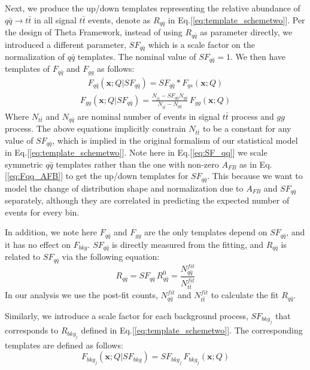 \documentclass{cmspaperpdf}
\begin{document}
Next, we produce the up/down templates representing the relative abundance of $q\bar{q}\rightarrow t\bar{t}$ in all signal $t\bar{t}$ events, denote as $R_{q\bar{q}}$ in Eq.[\ref{eq:template_schemetwo}]. Per the design of Theta Framework, instead of using $R_{q\bar{q}}$ as parameter directly,  we introduced a different parameter, $SF_{q\bar{q}}$ which is a scale factor on the normalization of $q\bar{q}$ templates. The nominal value of $SF_{q\bar{q}} = 1$. We then have templates of $F_{q\bar{q}}$ and $F_{gg}$ as follows:
\begin{align}
\label{eq:SF_qq}
F_{q\bar{q}}(\bm{x};Q|SF_{q\bar{q}})=SF_{q\bar{q}} * F_{qs}(\bm{x};Q) 
\end{align}
\begin{align}
F_{gg}(\bm{x};Q|SF_{q\bar{q}})=\frac{N_{t\bar{t}}-SF_{q\bar{q}}N_{q\bar{q}}}{N_{t\bar{t}}-N_{q\bar{q}}}\, F_{gg}(\bm{x};Q)
\end{align} 
Where $N_{t\bar{t}}$ and $N_{q\bar{q}}$ are nominal number of events in signal $t\bar{t}$ process and $gg$ process. The above equations implicitly constrain $N_{t\bar{t}}$ to be a constant for any value of $SF_{q\bar{q}}$, which is implied in the original formalism of our statistical model in Eq.[\ref{eq:template_schemetwo}]. Note here in Eq.[\ref{eq:SF_qq}] we scale symmetric $q\bar{q}$ templates rather than the one with non-zero $A_{FB}$ as in Eq.[\ref{eq:Fqq_AFB}] to get the up/down templates for $SF_{q\bar{q}}$. This because we want to model the change of distribution shape and normalization due to $A_{FB}$ and $SF_{q\bar{q}}$ separately, although they are correlated in predicting the expected number of events for every bin. 

In addition, we note here $F_{q\bar{q}}$ and $F_{gg}$ are the only templates depend on $SF_{q\bar{q}}$, and it has no effect on $F_{bkg}$. $SF_{q\bar{q}}$ is directly measured from the fitting, and $R_{q\bar{q}}$ is related to $SF_{q\bar{q}}$ via the following equation:
\begin{equation}
R_{q\bar{q}} = SF_{q\bar{q}}\,R_{q\bar{q}}^0 = \frac{N_{q\bar{q}}^{fit}}{N_{t\bar{t}}^{fit}}
\end{equation}
In our analysis we use the post-fit counts, $N_{q\bar{q}}^{fit}$ and $N_{t\bar{t}}^{fit}$ to calculate the fit $R_{q\bar{q}}$.

Similarly, we introduce a scale factor for each background process, $SF_{bkg_j}$ that corresponds to $R_{bkg_j}$ defined in Eq.[\ref{eq:template_schemetwo}]. The corresponding templates are defined as follows:
\begin{equation}
\label{eq:SF_bkg}
F_{bkg_j}(\bm{x};Q|SF_{bkg}) = SF_{bkg_j}\,F_{bkg_j}(\bm x ;Q) 
\end{equation}
\end{document}
